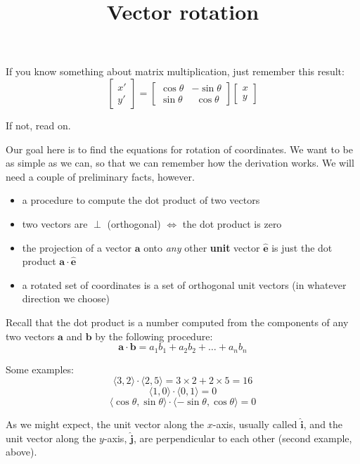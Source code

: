 \documentclass[11pt, oneside]{article}   	%
\title{Vector rotation}
\date{}
\begin{document}
\maketitle
\Large

If you know something about matrix multiplication, just remember this result:
\[
\begin{bmatrix}  x' \\ y' \end{bmatrix}
=
\begin{bmatrix}  
\cos \theta & -\sin \theta \\
\sin \theta & \ \  \cos \theta 
\end{bmatrix}
\begin{bmatrix}  x \\ y \end{bmatrix}
\]

If not, read on.

Our goal here is to find the equations for rotation of coordinates.  We want to be as simple as we can, so that we can remember how the derivation works.  We will need a couple of preliminary facts, however.

\begin{itemize}
\item a procedure to compute the dot product of two vectors
\item two vectors are $\perp$ (orthogonal) $\iff$ the dot product is zero
\item the projection of a vector $\mathbf{a}$ onto \emph{any} other \textbf{unit} vector $\mathbf{\hat{e}}$ is just the dot product $\mathbf{a} \cdot \mathbf{\hat{e}}$ 
\item a rotated set of coordinates is a set of orthogonal unit vectors (in whatever direction we choose)
\end{itemize}

Recall that the dot product is a number computed from the components of any two vectors $\mathbf{a}$ and $\mathbf{b}$ by the following procedure:
\[ \mathbf{a} \cdot \mathbf{b} = a_1 b_1 + a_2 b_2 + \dots + a_n b_n \]

Some examples:
\[ \langle 3, 2 \rangle \cdot  \langle 2, 5 \rangle = 3 \times 2 + 2 \times 5 = 16 \]
\[ \langle 1, 0 \rangle \cdot  \langle 0, 1 \rangle = 0 \]
\[ \langle \cos \theta, \sin \theta \rangle \cdot  \langle -\sin \theta, \cos \theta \rangle = 0 \]

As we might expect, the unit vector along the $x$-axis, usually called $\hat{\mathbf{i}}$, and the unit vector along the $y$-axis, $\hat{\mathbf{j}}$, are perpendicular to each other (second example, above).
\end{document}
